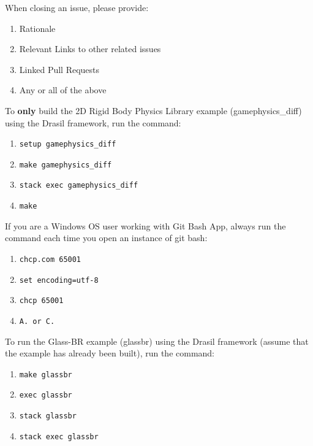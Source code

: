 \documentclass[12pt,fleqn]{examtst}
\begin{document}

\newpage
\noindent
\begin{minipage}{\textwidth}

When closing an issue, please provide:

\begin{enumerate}
    \item Rationale
    \item Relevant Links to other related issues
    \item Linked Pull Requests
    \item Any or all of the above \marker
\end{enumerate}

To \textbf{only} build the 2D Rigid Body Physics Library example (gamephysics\_diff) using the Drasil framework, run the command:

\begin{enumerate}
    \item \lstinline{setup gamephysics_diff}
    \item \lstinline{make gamephysics_diff} \marker
    \item \lstinline{stack exec gamephysics_diff}
    \item \lstinline{make}
\end{enumerate}

If you are a Windows OS user working with Git Bash App, always run the command each time you open an instance of git bash:

\begin{enumerate}
    \item \lstinline{chcp.com 65001} 
    \item \lstinline{set encoding=utf-8}
    \item \lstinline{chcp 65001}
    \item \lstinline{A. or C.} \marker
\end{enumerate}

To run the Glass-BR example (glassbr) using the Drasil framework (assume that the example has already been built), run the command:

\begin{enumerate}
    \item \lstinline{make glassbr}
    \item \lstinline{exec glassbr}
    \item \lstinline{stack glassbr}
    \item \lstinline{stack exec glassbr} \marker
\end{enumerate}

\end{minipage}
\end{document}
